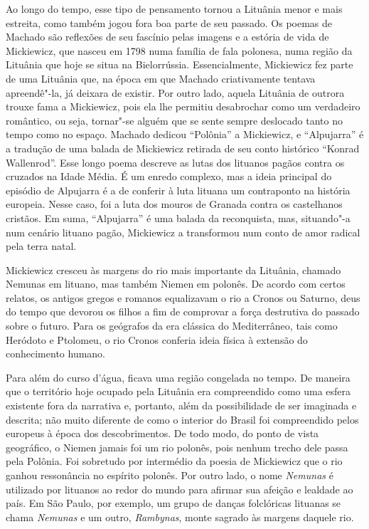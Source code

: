Ao longo do
tempo, esse tipo de pensamento tornou a Lituânia menor e mais estreita,
como também jogou fora boa parte de seu passado. Os poemas de Machado
são reflexões de seu fascínio pelas imagens e a estória de vida de
Mickiewicz, que nasceu em 1798 numa família de fala polonesa, numa
região da Lituânia que hoje se situa na Bielorrússia. Essencialmente,
Mickiewicz fez parte de uma Lituânia que, na época em que Machado
criativamente tentava apreendê"-la, já deixara de existir. Por outro
lado, aquela Lituânia de outrora trouxe fama a Mickiewicz, pois ela lhe
permitiu desabrochar como um verdadeiro romântico, ou seja, tornar"-se
alguém que se sente sempre deslocado tanto no tempo como no espaço.
Machado dedicou ``Polônia'' a Mickiewicz, e ``Alpujarra'' é a
tradução de uma balada de Mickiewicz retirada de seu conto histórico
``Konrad Wallenrod''. Esse longo poema descreve as lutas dos lituanos
pagãos contra os cruzados na Idade Média. É um enredo complexo, mas a
ideia principal do episódio de Alpujarra é a de conferir à luta lituana
um contraponto na história europeia. Nesse caso, foi a luta dos mouros
de Granada contra os castelhanos cristãos. Em suma, ``Alpujarra'' é
uma balada da reconquista, mas, situando"-a num cenário lituano pagão,
Mickiewicz a transformou num conto de amor radical pela terra natal.

Mickiewicz cresceu às margens do rio mais importante da Lituânia,
chamado Nemunas em lituano, mas também Niemen em polonês. De acordo com
certos relatos, os antigos gregos e romanos equalizavam o rio a Cronos
ou Saturno, deus do tempo que devorou os filhos a fim de comprovar a
força destrutiva do passado sobre o futuro. Para os geógrafos da era
clássica do Mediterrâneo, tais como Heródoto e Ptolomeu, o rio Cronos
conferia ideia física à extensão do conhecimento humano.

Para além do curso d'água, ficava uma região congelada no tempo. De
maneira que o território hoje ocupado pela Lituânia era compreendido
como uma esfera existente fora da narrativa e, portanto, além da
possibilidade de ser imaginada e descrita; não muito diferente de como o
interior do Brasil foi compreendido pelos europeus à época dos
descobrimentos. De todo modo, do ponto de vista geográfico, o Niemen
jamais foi um rio polonês, pois nenhum trecho dele passa pela Polônia.
Foi sobretudo por intermédio da poesia de Mickiewicz que o rio ganhou
ressonância no espírito polonês. Por outro lado, o nome \textit{Nemunas} é
utilizado por lituanos ao redor do mundo para afirmar sua afeição e
lealdade ao país. Em São Paulo, por exemplo, um grupo de danças
folclóricas lituanas se chama \textit{Nemunas} e um outro,
\textit{Rambynas}, monte sagrado às margens daquele rio.

